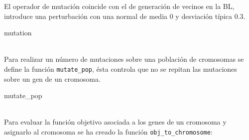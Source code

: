 \documentclass[11pt,a4paper]{article}
\theoremstyle{definition}
\begin{document}
	El operador de mutación coincide con el de generación de vecinos en la BL, introduce una perturbación con una normal de media 0 y desviación típica $0.3$.  \\
	
	\begin{algorithm}[H]
		\caption{mutation}
	\end{algorithm}~\\
	
	Para realizar un número de mutaciones sobre una población de cromosomas se define la función \texttt{mutate\_pop}, ésta controla que no se repitan las mutaciones sobre un gen de un cromosoma.\\
	
	\begin{algorithm}[H]
		\caption{mutate\_pop}
	\end{algorithm}~\\
	
		Para evaluar la función objetivo asociada a los genes de un cromosoma y asignarlo al cromosoma se ha creado la función \texttt{obj\_to\_chromosome}:\\
		
\end{document}
